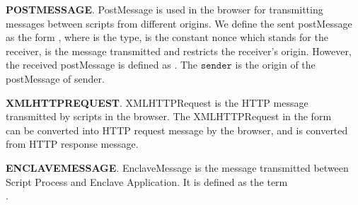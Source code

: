 \vspace{1mm}\noindent\textbf{POSTMESSAGE}.
PostMessage is used in the browser for transmitting messages between scripts from different origins. We define the sent postMessage as the form , where  is the type,  is the constant nonce which stands for the receiver,  is the message transmitted and  restricts the receiver's origin. However, the received postMessage is defined as . The $\mathtt{sender}$ is the origin of the postMessage of sender.

\vspace{1mm}\noindent\textbf{XMLHTTPREQUEST}.
XMLHTTPRequest is the HTTP message transmitted  by scripts in the browser. The XMLHTTPRequest in the form \\  can be converted into HTTP request message by the browser, and   is converted from HTTP response message.

\vspace{1mm}\noindent\textbf{ENCLAVEMESSAGE}.
EnclaveMessage is the message transmitted between Script Process and Enclave Application. It is defined as the term \\ .


